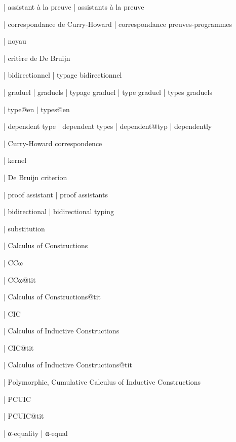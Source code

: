   | assistant à la preuve
  | assistants à la preuve

  | correspondance de Curry-Howard
  | correspondance preuves-programmes

  | noyau

  | critère de De Bruijn

  | bidirectionnel
  | typage bidirectionnel

  | graduel
  | graduels
  | typage graduel
  | type graduel
  | types graduels


  | type@en
  | types@en

  | dependent type
  | dependent types
  | dependent@typ
  | dependently

  | Curry-Howard correspondence

  | kernel

  | De Bruijn criterion

  | proof assistant
  | proof assistants

  | bidirectional
  | bidirectional typing


  | substitution


  | Calculus of Constructions

  | CCω

  | CCω@tit

  | Calculus of Constructions@tit

  | CIC

  | Calculus of Inductive Constructions

  | CIC@tit

  | Calculus of Inductive Constructions@tit

  | Polymorphic, Cumulative Calculus of Inductive Constructions

  | PCUIC

  | PCUIC@tit

  | α-equality
  | α-equal 

